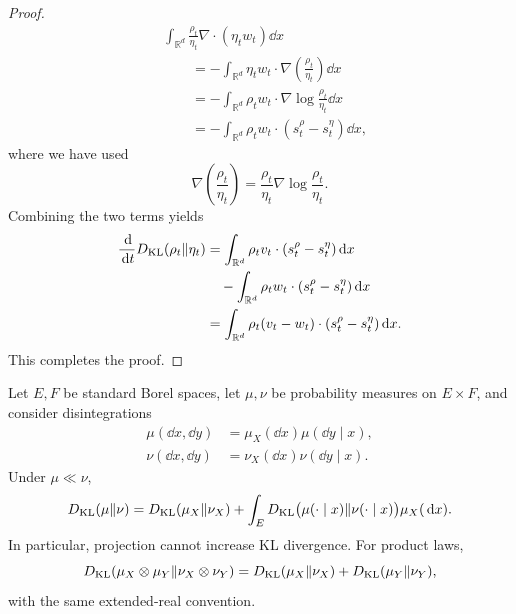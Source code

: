 \documentclass[12pt,a4paper,oneside]{book}
\begin{document}
\begin{proof}
\begin{equation*}
\begin{aligned}
        &\int_{\mathbb R^d}
        \frac{\rho_t}{\eta_t}
        \nabla\cdot(\eta_t w_t)\dd x\\
        &\qquad=
        -\int_{\mathbb R^d}
        \eta_t w_t\cdot
        \nabla\left(\frac{\rho_t}{\eta_t}\right)\dd x\\
        &\qquad=
        -\int_{\mathbb R^d}
        \rho_t w_t\cdot
        \nabla\log\frac{\rho_t}{\eta_t}\dd x\\
        &\qquad=
        -\int_{\mathbb R^d}
        \rho_t w_t\cdot(s_t^\rho-s_t^\eta)\dd x,
    \end{aligned}
\end{equation*}
where we have used
\begin{equation*}
    \nabla\left(\frac{\rho_t}{\eta_t}\right)
    =\frac{\rho_t}{\eta_t}
    \nabla\log\frac{\rho_t}{\eta_t}.
\end{equation*}
Combining the two terms yields
\begin{equation*}
    \begin{aligned}
        \frac{\,\mathrm{d}}{\,\mathrm{d} t}D_{\mathrm{KL}}(\rho_t\Vert\eta_t)
        &=\int_{\mathbb R^d}
        \rho_t v_t\cdot(s_t^\rho-s_t^\eta)\,\mathrm{d} x\\
        &\quad-
        \int_{\mathbb R^d}
        \rho_t w_t\cdot(s_t^\rho-s_t^\eta)\,\mathrm{d} x\\
        &=\int_{\mathbb R^d}
        \rho_t(v_t-w_t)\cdot(s_t^\rho-s_t^\eta)\,\mathrm{d} x.
    \end{aligned}
\end{equation*}
This completes the proof.
\end{proof}



\begin{theorem}
\label{thm:klchain}
\label{src:p11q7}
Let $E,F$ be standard Borel spaces, let $\mu,\nu$ be probability measures on $E\times F$, and consider disintegrations
\begin{equation*}
    \begin{aligned}
        \mu(\dd x,\dd y)&=\mu_X(\dd x)\mu(\dd y\mid x),\\
        \nu(\dd x,\dd y)&=\nu_X(\dd x)\nu(\dd y\mid x).
    \end{aligned}
\end{equation*}
Under $\mu\ll\nu$,
\begin{equation*}
    \begin{aligned}
    D_{\mathrm{KL}}(\mu\Vert\nu) = D_{\mathrm{KL}}(\mu_X\Vert\nu_X) + \int_ED_{\mathrm{KL}}\big(\mu(\cdot\mid x)\Vert\nu(\cdot\mid x)\big) \mu_X(\,\mathrm{d} x).
    \end{aligned}
\end{equation*}
In particular, projection cannot increase KL divergence. For product laws,
\begin{equation*}
    D_{\mathrm{KL}}(\mu_X\otimes\mu_Y\Vert\nu_X\otimes\nu_Y) = D_{\mathrm{KL}}(\mu_X\Vert\nu_X)+D_{\mathrm{KL}}(\mu_Y\Vert\nu_Y),
\end{equation*}
with the same extended-real convention.
\end{theorem}
\end{document}
